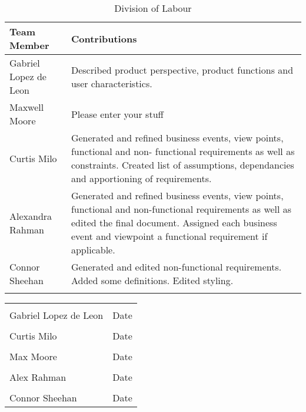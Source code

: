 \documentclass[titlepage]{article}
\newcounter{req}
\begin{document}
		\begin{longtable}{| p{} | p{} |}
			\hline
			\textbf {Team Member} & \textbf{Contributions}\\ 
			\hline
			Gabriel Lopez de Leon & Described product perspective, product functions and user characteristics.\\
			\hline
			Maxwell Moore & Please enter your stuff\\
			\hline
			Curtis Milo & Generated and refined business events, view points, functional and non- functional requirements as well as constraints. Created list of assumptions, dependancies and apportioning of requirements. \\ 
			\hline
			Alexandra Rahman & Generated and refined business events, view points, functional and non-functional requirements as well as edited the final document. Assigned each business event and viewpoint a functional requirement if applicable.\\
			\hline
			Connor Sheehan & Generated and edited non-functional requirements. Added some definitions. Edited styling.\\
			\hline
			
			\caption{Division of Labour}
		\end{longtable}
		
	\noindent\begin{tabular}{ll}\\
	\makebox[2.5in]{\hrulefill} & \makebox[2.5in]			{\hrulefill}\\
	Gabriel Lopez de Leon & Date\\[8ex]%
	\makebox[2.5in]{\hrulefill} & \makebox[2.5in]			{\hrulefill}\\
	Curtis Milo & Date\\[8ex]
	\makebox[2.5in]{\hrulefill} & \makebox[2.5in]			{\hrulefill}\\
	Max Moore & Date\\[8ex]
	\makebox[2.5in]{\hrulefill} & \makebox[2.5in]			{\hrulefill}\\
	Alex Rahman & Date\\[8ex]
	\makebox[2.5in]{\hrulefill} & \makebox[2.5in]			{\hrulefill}\\
	Connor Sheehan & Date\\
	\end{tabular}
		
		
		
		
		
		\iffalse
		\newpage
\end{document}
